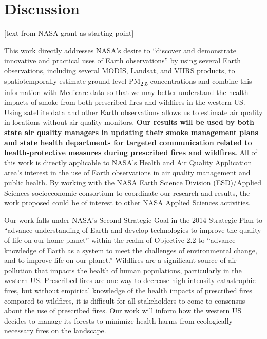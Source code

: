\documentclass[authoryear]{elsarticle}
\begin{document}
\section{Discussion}

[text from NASA grant as starting point]

This work directly addresses NASA's desire to ``discover and demonstrate innovative and practical uses of Earth observations'' by using several Earth observations, including several MODIS, Landsat, and VIIRS products, to spatiotemporally estimate ground-level PM\textsubscript{2.5} concentrations and combine this information with Medicare data so that we may better understand the health impacts of smoke from both prescribed fires and wildfires in the western US. Using satellite data and other Earth observations allows us to estimate air quality in locations without air quality monitors. \textbf{Our results will be used by both state air quality managers in updating their smoke management plans and state health departments for targeted communication related to health-protective measures during prescribed fires and wildfires.} All of this work is directly applicable to NASA's Health and Air Quality Application area's interest in the use of Earth observations in air quality management and public health. By working with the NASA Earth Science Division (ESD)/Applied Sciences socioeconomic consortium to coordinate our research and results, the work proposed could be of interest to other NASA Applied Sciences activities.

Our work falls under NASA's Second Strategic Goal in the 2014 Strategic Plan to ``advance understanding of Earth and develop technologies to improve the quality of life on our home planet'' within the realm of Objective 2.2 to ``advance knowledge of Earth as a system to meet the challenges of environmental change, and to improve life on our planet.'' Wildfires are a significant source of air pollution that impacts the health of human populations, particularly in the western US. Prescribed fires are one way to decrease high-intensity catastrophic fires, but without empirical knowledge of the health impacts of prescribed fires compared to wildfires, it is difficult for all stakeholders to come to consensus about the use of prescribed fires. 
Our work will inform how the western US decides to manage its forests to minimize health harms from ecologically necessary fires on the landscape. 
\end{document}
